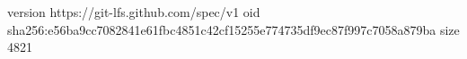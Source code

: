 version https://git-lfs.github.com/spec/v1
oid sha256:e56ba9cc7082841e61fbc4851c42cf15255e774735df9ec87f997c7058a879ba
size 4821
